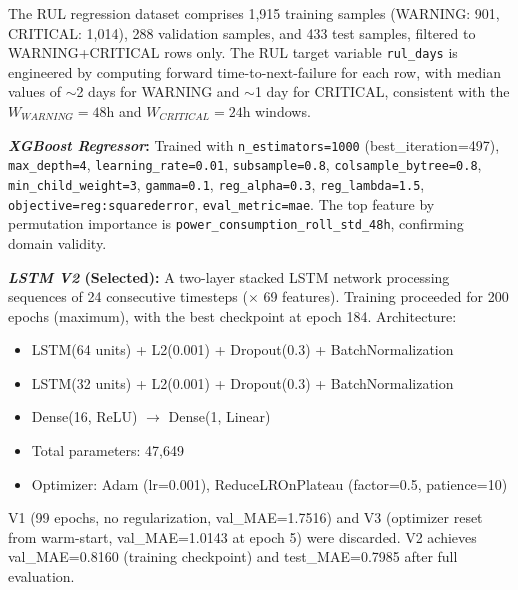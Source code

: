 \documentclass[conference]{IEEEtran}
\begin{document}
The RUL regression dataset comprises 1,915 training samples (WARNING: 901, CRITICAL: 1,014), 288 validation samples, and 433 test samples, filtered to WARNING+CRITICAL rows only. The RUL target variable \texttt{rul\_days} is engineered by computing forward time-to-next-failure for each row, with median values of $\sim$2 days for WARNING and $\sim$1 day for CRITICAL, consistent with the $W_{WARNING}=48$h and $W_{CRITICAL}=24$h windows.

\textbf{\textit{XGBoost Regressor}:} Trained with \texttt{n\_estimators=1000} (best\_iteration=497), \texttt{max\_depth=4}, \texttt{learning\_rate=0.01}, \texttt{subsample=0.8}, \texttt{colsample\_bytree=0.8}, \texttt{min\_child\_weight=3}, \texttt{gamma=0.1}, \texttt{reg\_alpha=0.3}, \texttt{reg\_lambda=1.5}, \texttt{objective=reg:squarederror}, \texttt{eval\_metric=mae}. The top feature by permutation importance is \texttt{power\_consumption\_roll\_std\_48h}, confirming domain validity.

\textbf{\textit{LSTM V2} (Selected):} A two-layer stacked LSTM network processing sequences of 24 consecutive timesteps ($\times$ 69 features). Training proceeded for 200 epochs (maximum), with the best checkpoint at epoch 184. Architecture:
\begin{itemize}
\item LSTM(64 units) + L2(0.001) + Dropout(0.3) + BatchNormalization
\item LSTM(32 units) + L2(0.001) + Dropout(0.3) + BatchNormalization
\item Dense(16, ReLU) $\rightarrow$ Dense(1, Linear)
\item Total parameters: 47,649
\item Optimizer: Adam (lr=0.001), ReduceLROnPlateau (factor=0.5, patience=10)
\end{itemize}
V1 (99 epochs, no regularization, val\_MAE=1.7516) and V3 (optimizer reset from warm-start, val\_MAE=1.0143 at epoch 5) were discarded. V2 achieves val\_MAE=0.8160 (training checkpoint) and test\_MAE=0.7985 after full evaluation.

\end{document}
